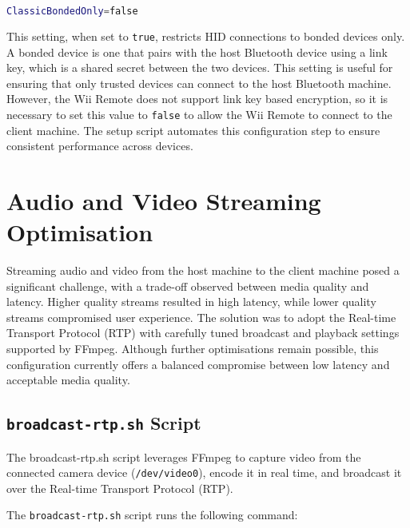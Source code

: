\begin{lstlisting}[language=bash]
ClassicBondedOnly=false
\end{lstlisting}


This setting, when set to \texttt{true}, restricts HID connections to bonded devices only. A bonded device is one that pairs with the host Bluetooth device using a link key, which is a shared secret between the two devices. This setting is useful for ensuring that only trusted devices can connect to the host Bluetooth machine. However, the Wii Remote does not support link key based encryption, so it is necessary to set this value to \texttt{false} to allow the Wii Remote to connect to the client machine. The setup script automates this configuration step to ensure consistent performance across devices.

\section{Audio and Video Streaming Optimisation}
\label{sec:audio-video-streaming}
Streaming audio and video from the host machine to the client machine posed a
significant challenge, with a trade-off observed between media quality and
latency. Higher quality streams resulted in high latency, while lower quality
streams compromised user experience. The solution was to adopt the Real-time
Transport Protocol (RTP) with carefully tuned broadcast and playback settings supported by FFmpeg\cite{wikipediaFFmpeg}. Although further optimisations remain possible, this configuration currently
offers a balanced compromise between low latency and acceptable media quality.

\subsection{\texttt{broadcast-rtp.sh} Script}

The broadcast-rtp.sh script leverages FFmpeg to capture video from the connected
camera device (\texttt{/dev/video0}), encode it in real time, and broadcast it
over the Real-time Transport Protocol (RTP).

The \texttt{broadcast-rtp.sh} script runs the following command:

